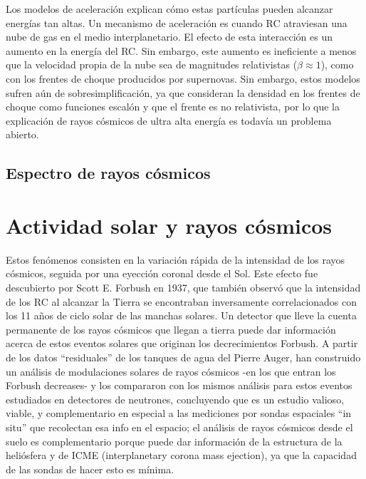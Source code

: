 \documentclass{book}
\begin{document}
Los modelos de aceleraci\'on explican c\'omo estas part\'iculas pueden alcanzar energ\'ias tan altas. Un mecanismo de aceleraci\'on es cuando RC atraviesan una nube de gas en el medio interplanetario. El efecto de esta interacci\'on es un aumento en la energ\'ia del RC. Sin embargo, este aumento es ineficiente a menos que la velocidad propia de la nube sea de magnitudes relativistas ($\beta\approx1$), como con los frentes de choque producidos por supernovas. Sin embargo, estos modelos sufren a\'un de sobresimplificaci\'on, ya que consideran la densidad en los frentes de choque como funciones escal\'on y que el frente es no relativista, por lo que la explicaci\'on de rayos c\'osmicos de ultra alta energ\'ia es todav\'ia un problema abierto. \citep{ASOREY}

\subsection{Espectro de rayos c\'osmicos}

\section{Actividad solar y rayos c\'osmicos}

Estos fen\'omenos consisten en la variaci\'on r\'apida de la intensidad de los rayos c\'osmicos, seguida por una eyecci\'on coronal desde el Sol. Este efecto fue descubierto por Scott E. Forbush en 1937, que tambi\'en observ\'o que la intensidad de los RC al alcanzar la Tierra se encontraban inversamente correlacionados con los 11 a\~nos de ciclo solar de las manchas solares. Un detector que lleve la cuenta permanente de los rayos c\'osmicos que llegan a tierra puede dar informaci\'on acerca de estos eventos solares que originan los decrecimientos Forbush. A partir de los datos “residuales” de los tanques de agua del Pierre Auger, han construido un an\'alisis de modulaciones solares de rayos c\'osmicos -en los que entran los Forbush decreases- y los compararon con los mismos an\'alisis para estos eventos estudiados en detectores de neutrones, concluyendo que es un estudio valioso, viable, y complementario en especial a las mediciones por sondas espaciales “in situ” que recolectan esa info en el espacio; el an\'alisis de rayos c\'osmicos desde el suelo es complementario porque puede dar informaci\'on de la estructura de la heli\'osfera y de ICME (interplanetary corona mass ejection), ya que la capacidad de las sondas de hacer esto es m\'inima. \citep{VILLASENOR}
\end{document}
